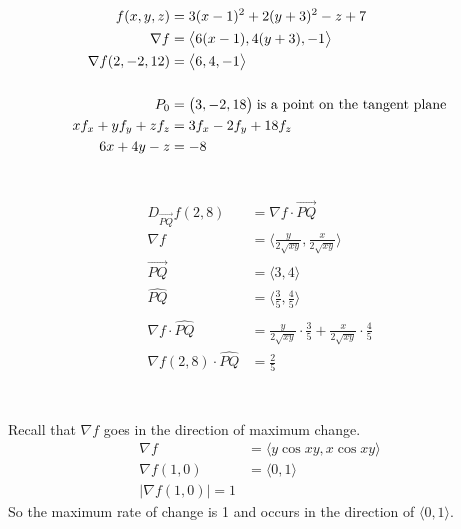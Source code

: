 \documentclass{article}
\begin{document}
\section{} %
\begin{align*}
	f(x,y,z)&=3(x-1)^2+2(y+3)^2-z+7\\
	\nabla{f}&=\big\langle6(x-1),4(y+3),-1\big\rangle\\
	\nabla{f}(2,-2,12)&=\big\langle6,4,-1\big\rangle\\\\
	P_0&=\big(3,-2,18\big)\text{\;is a point on the tangent plane}\\
	xf_x+yf_y+zf_z&=3f_x-2f_y+18f_z\\
	6x+4y-z&=-8
\end{align*}
\section{} %
\begin{align*}
	D_{\vec{PQ}}f(2,8)&=\nabla{f}\cdot\vec{PQ}\\
	\nabla{f}&=\bigg\langle\frac{y}{2\sqrt{xy}},\frac{x}{2\sqrt{xy}}\bigg\rangle\\
	\vec{PQ}&=\big\langle3,4\big\rangle\\
	\hat{PQ}&=\bigg\langle\frac{3}{5},\frac{4}{5}\bigg\rangle\\\\
	\nabla{f}\cdot\hat{PQ}&=\frac{y}{2\sqrt{xy}}\cdot\frac{3}{5}+\frac{x}{2\sqrt{xy}}\cdot\frac{4}{5}\\
	\nabla{f}(2,8)\cdot\hat{PQ}&=\frac{2}{5}\\
\end{align*}
\section{} %
Recall that $\nabla{f}$ goes in the direction of maximum change.
\begin{align*}
	\nabla{f}&=\big\langle y\cos{xy},x\cos{xy} \big\rangle\\
	\nabla{f}(1,0)&=\big\langle0,1\big\rangle\\
	|\nabla{f}(1,0)|=1
\end{align*}
So the maximum rate of change is 1 and occurs in the direction of $\big\langle0,1\big\rangle$.
\end{document}
